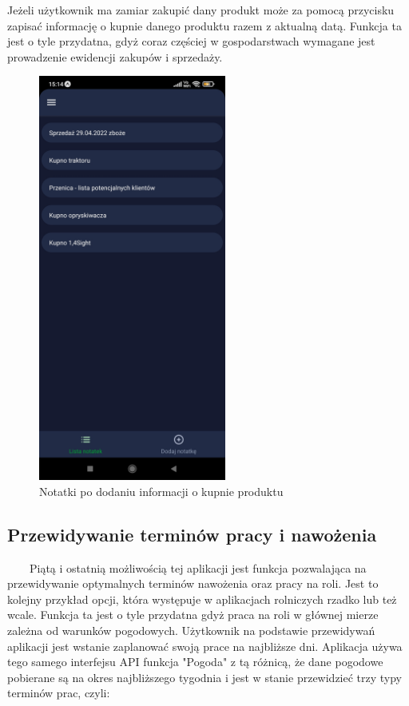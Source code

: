 \documentclass[a4paper,12pt,oneside]{book}
\begin{document}
		\newpage
		
		Jeżeli użytkownik ma zamiar zakupić dany produkt może za pomocą przycisku zapisać informację o kupnie danego produktu razem z aktualną datą. Funkcja ta jest o tyle przydatna, gdyż coraz częściej w gospodarstwach wymagane jest prowadzenie ewidencji zakupów i sprzedaży.
		
		\begin{figure}[H]
			\centering
			\includegraphics[width=0.55\textwidth]{grafika/wysz_c.jpg}
			\caption{Notatki po dodaniu informacji o kupnie produktu}
		\end{figure}
	
	\subsection{Przewidywanie terminów pracy i nawożenia}
	\ \ \ \
		Piątą i ostatnią możliwością tej aplikacji jest funkcja pozwalająca na przewidywanie optymalnych terminów nawożenia oraz pracy na roli. Jest to kolejny przykład opcji, która występuje w aplikacjach rolniczych rzadko lub też wcale. Funkcja ta jest o tyle przydatna gdyż praca na roli w głównej mierze zależna od warunków pogodowych. Użytkownik na podstawie przewidywań aplikacji jest wstanie zaplanować swoją prace na najbliższe dni. Aplikacja używa tego samego interfejsu API funkcja "Pogoda" z tą różnicą, że dane pogodowe pobierane są na okres najbliższego tygodnia i jest w stanie przewidzieć trzy typy terminów prac, czyli:
		
\end{document}
